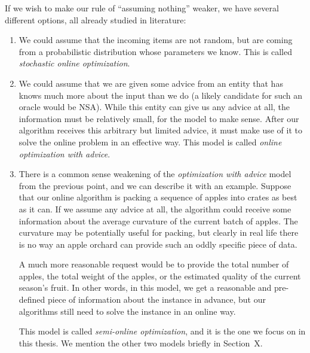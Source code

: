 If we wish to make our rule of ``assuming nothing'' weaker, we have
several different options, all already studied in literature:

\begin{enumerate}

\item We could assume that the incoming items are not random, but
are coming from a probabilistic distribution whose parameters we know.
This is called \textit{stochastic online optimization}.

\item We could assume that we are given some advice from an entity
that has knows much more about the input than we do (a likely
candidate for such an oracle would be NSA). While this entity can give
us any advice at all, the information must be relatively small, for
the model to make sense. After our algorithm receives this arbitrary
but limited advice, it must make use of it to solve the online problem
in an effective way. This model is called \textit{online optimization
with advice}.

\item There is a common sense weakening of the \textit{optimization
with advice} model from the previous point, and we can describe it
with an example. Suppose that our online algorithm is packing a
sequence of apples into crates as best as it can. If we assume any
advice at all, the algorithm could receive some information about the
average curvature of the current batch of apples. The curvature may
be potentially useful for packing, but clearly in real life there is no
way an apple orchard can provide such an oddly specific piece of data.

A much more reasonable request would be to provide the total number of
apples, the total weight of the apples, or the estimated quality of
the current season's fruit. In other words, in this model, we get a
reasonable and pre-defined piece of information about the instance in
advance, but our algorithms still need to solve the instance in an
online way.

This model is called \textit{semi-online optimization}, and it is the
one we focus on in this thesis. We mention the other two models briefly
in Section~X. 

\end{enumerate}